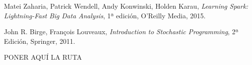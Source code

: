 

\begin{thebibliography}{99}
% 
% 
% 

 Matei Zaharia, Patrick Wendell, Andy Konwinski, Holden Karau, {\it Learning Spark: Lightning-Fast Big Data Analysis}, 1ª edición, O'Reilly Media, 2015.

 John R. Birge, François Louveaux, {\it Introduction to Stochastic Programming}, 2ª Edición, Springer, 2011.


 PONER AQUÍ LA RUTA

\end{thebibliography}

